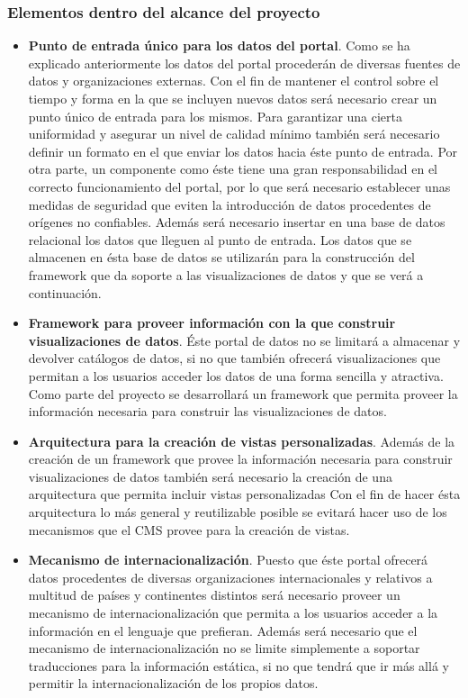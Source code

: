 \subsubsection{Elementos dentro del alcance del proyecto}
\begin{itemize}
\item \textbf{Punto de entrada único para los datos del portal}.  Como se ha explicado anteriormente los datos del portal procederán de diversas fuentes de datos y organizaciones externas.  Con el fin de mantener el control sobre el tiempo y forma en la que se incluyen nuevos datos será necesario crear un punto único de entrada para los mismos.  Para garantizar una cierta uniformidad y asegurar un nivel de calidad mínimo también será necesario definir un formato en el que enviar los datos hacia éste punto de entrada.\newline
Por otra parte, un componente como éste tiene una gran responsabilidad en el correcto funcionamiento del portal, por lo que será necesario establecer unas medidas de seguridad que eviten la introducción de datos procedentes de orígenes no confiables.\newline
Además será necesario insertar en una base de datos relacional los datos que lleguen al punto de entrada.  Los datos que se almacenen en ésta base de datos se utilizarán para la construcción del framework que da soporte a las visualizaciones de datos y que se verá a continuación.
\item \textbf{Framework para proveer información con la que construir visualizaciones de datos}.  Éste portal de datos no se limitará a almacenar y devolver catálogos de datos, si no que también ofrecerá visualizaciones que permitan a los usuarios acceder los datos de una forma sencilla y atractiva.  Como parte del proyecto se desarrollará un framework que permita proveer la información necesaria para construir las visualizaciones de datos.
\item \textbf{Arquitectura para la creación de vistas personalizadas}.  Además de la creación de un framework que provee la información necesaria para construir visualizaciones de datos también será necesario la creación de una arquitectura que permita incluir vistas personalizadas   Con el fin de hacer ésta arquitectura lo más general y reutilizable posible se evitará hacer uso de los mecanismos que el CMS provee para la creación de vistas.
\item \textbf{Mecanismo de internacionalización}.  Puesto que éste portal ofrecerá datos procedentes de diversas organizaciones internacionales y relativos a multitud de países y continentes distintos será necesario proveer un mecanismo de internacionalización que permita a los usuarios acceder a la información en el lenguaje que prefieran.  Además será necesario que el mecanismo de internacionalización no se limite simplemente a soportar traducciones para la información estática, si no que tendrá que ir más allá y permitir la internacionalización de los propios datos.

\end{itemize}
